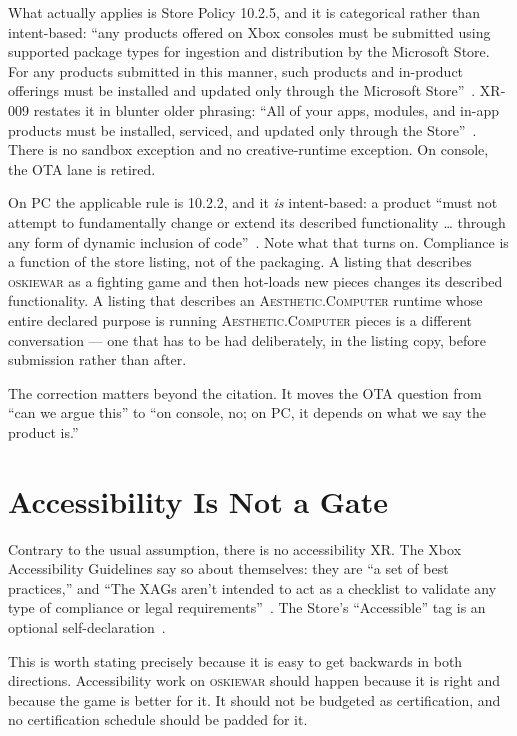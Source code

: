 \documentclass[10pt,letterpaper,twocolumn]{article}
\newcommand{\ac}{\textsc{Aesthetic.Computer}}
\newcommand{\game}{\textsc{oskiewar}}
\begin{document}
What actually applies is Store Policy 10.2.5, and it is categorical rather than intent-based: ``any products offered on Xbox consoles must be submitted using supported package types for ingestion and distribution by the Microsoft Store. For any products submitted in this manner, such products and in-product offerings must be installed and updated only through the Microsoft Store''~\cite{msStorePolicies}. XR-009 restates it in blunter older phrasing: ``All of your apps, modules, and in-app products must be installed, serviced, and updated only through the Store''~\cite{msXR}. There is no sandbox exception and no creative-runtime exception. On console, the OTA lane is retired.

On PC the applicable rule is 10.2.2, and it \emph{is} intent-based: a product ``must not attempt to fundamentally change or extend its described functionality \dots{} through any form of dynamic inclusion of code''~\cite{msStorePolicies}. Note what that turns on. Compliance is a function of the store listing, not of the packaging. A listing that describes \game{} as a fighting game and then hot-loads new pieces changes its described functionality. A listing that describes an \ac{} runtime whose entire declared purpose is running \ac{} pieces is a different conversation --- one that has to be had deliberately, in the listing copy, before submission rather than after.

The correction matters beyond the citation. It moves the OTA question from ``can we argue this'' to ``on console, no; on PC, it depends on what we say the product is.''

\section{Accessibility Is Not a Gate}

Contrary to the usual assumption, there is no accessibility XR. The Xbox Accessibility Guidelines say so about themselves: they are ``a set of best practices,'' and ``The XAGs aren't intended to act as a checklist to validate any type of compliance or legal requirements''~\cite{msXAG}. The Store's ``Accessible'' tag is an optional self-declaration~\cite{msAccessibleTag}.

This is worth stating precisely because it is easy to get backwards in both directions. Accessibility work on \game{} should happen because it is right and because the game is better for it. It should not be budgeted as certification, and no certification schedule should be padded for it.
\end{document}
